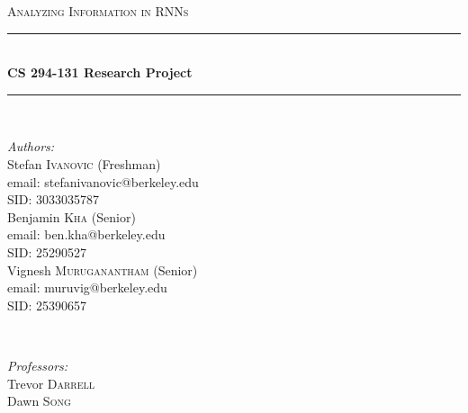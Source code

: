 \begin{titlepage}

\newcommand{\HRule}{\rule{\linewidth}{0.5mm}} %

\center %
 

\textsc{\LARGE Analyzing Information in RNNs}\\[0.5cm] %


\HRule \\[0.4cm]
{ \huge \bfseries CS 294-131 Research Project}\\[0.4cm] %
\HRule \\[1.5cm]
 

\begin{minipage}{0.5\textwidth}
\begin{flushleft} \large
\emph{Authors:}\\
Stefan \textsc{Ivanovic} (Freshman) \\%
email: stefanivanovic@berkeley.edu\\
SID: 3033035787\\
\bigskip
Benjamin \textsc{Kha} (Senior) \\%
email: ben.kha@berkeley.edu\\
SID: 25290527\\
\bigskip
Vignesh \textsc{Muruganantham} (Senior) \\%
email: muruvig@berkeley.edu\\
SID: 25390657\\
\end{flushleft}
\end{minipage}
~
\begin{minipage}{0.4\textwidth}
\begin{flushright} \large
\emph{Professors:} \\
Trevor \textsc{Darrell} \\%
Dawn \textsc{Song} \\%
\end{flushright}
\end{minipage}\\[2cm]


\end{titlepage}
